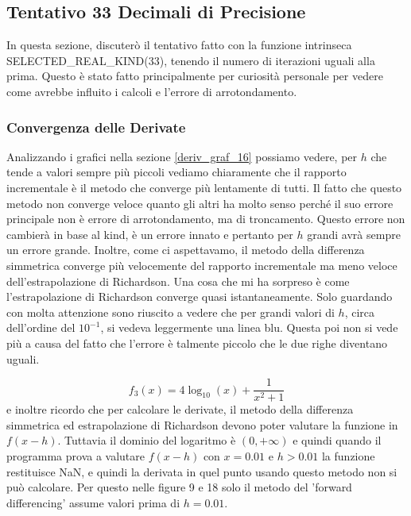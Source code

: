 \documentclass[a4paper]{article}
\begin{document}
{{\subsection{Tentativo 33 Decimali di Precisione}
In questa sezione, discuterò il tentativo fatto con la funzione intrinseca SELECTED\_REAL\_KIND(33), tenendo il numero di iterazioni uguali alla prima. Questo è stato fatto principalmente per curiosità personale per vedere come avrebbe influito i calcoli e l'errore di arrotondamento. 

\subsubsection{Convergenza delle Derivate}
Analizzando i grafici nella sezione \ref{deriv_graf_16} possiamo vedere, per $h$ che tende a valori sempre più piccoli vediamo chiaramente che il rapporto incrementale è il metodo che converge più lentamente di tutti. Il fatto che questo metodo non converge veloce quanto gli altri ha molto senso perché il suo errore principale non è errore di arrotondamento, ma di troncamento. Questo errore non cambierà in base al kind, è un errore innato e pertanto per $h$ grandi avrà sempre un errore grande. Inoltre, come ci aspettavamo, il metodo della differenza simmetrica converge più velocemente del rapporto incrementale ma meno veloce dell'estrapolazione di Richardson. Una cosa che mi ha sorpreso è come l'estrapolazione di Richardson converge quasi istantaneamente. Solo guardando con molta attenzione sono riuscito a vedere che per grandi valori di $h$, circa dell'ordine del $10^{-1}$, si vedeva leggermente una linea blu. Questa poi non si vede più a causa del fatto che l'errore è talmente piccolo che le due righe diventano uguali.

\begin{equation}
    f_3(x) = 4\log_{10}(x)+\frac{1}{x^2+1}
\end{equation}
e inoltre ricordo che per calcolare le derivate, il metodo della differenza simmetrica ed estrapolazione di Richardson devono poter valutare la funzione in $f(x-h)$. Tuttavia il dominio del logaritmo è $(0,+\infty)$ e quindi quando il programma prova a valutare $f(x-h)$ con $x=0.01$ e $h>0.01$ la funzione restituisce NaN, e quindi la derivata in quel punto usando questo metodo non si può calcolare. Per questo nelle figure 9 e 18 solo il metodo del 'forward differencing' assume valori prima di $h=0.01$.

}}
\end{document}

